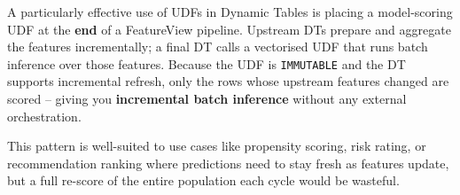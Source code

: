 \documentclass[
  letterpaper,
  DIV=11,
  numbers=noendperiod]{scrreprt}
\newenvironment{Shaded}{\begin{snugshade}}{\end{snugshade}}
\newcommand{\CommentTok}[1]{\textcolor[rgb]{0.37,0.37,0.37}{#1}}
\newcommand{\NormalTok}[1]{\textcolor[rgb]{0.00,0.23,0.31}{#1}}
\newcommand{\OperatorTok}[1]{\textcolor[rgb]{0.37,0.37,0.37}{#1}}
\newcommand{\StringTok}[1]{\textcolor[rgb]{0.13,0.47,0.30}{#1}}
\begin{document}
A particularly effective use of UDFs in Dynamic Tables is placing a
model-scoring UDF at the \textbf{end} of a FeatureView pipeline.
Upstream DTs prepare and aggregate the features incrementally; a final
DT calls a vectorised UDF that runs batch inference over those features.
Because the UDF is \texttt{IMMUTABLE} and the DT supports incremental
refresh, only the rows whose upstream features changed are scored --
giving you \textbf{incremental batch inference} without any external
orchestration.

\begin{Shaded}
\end{Shaded}

This pattern is well-suited to use cases like propensity scoring, risk
rating, or recommendation ranking where predictions need to stay fresh
as features update, but a full re-score of the entire population each
cycle would be wasteful.
\end{document}
